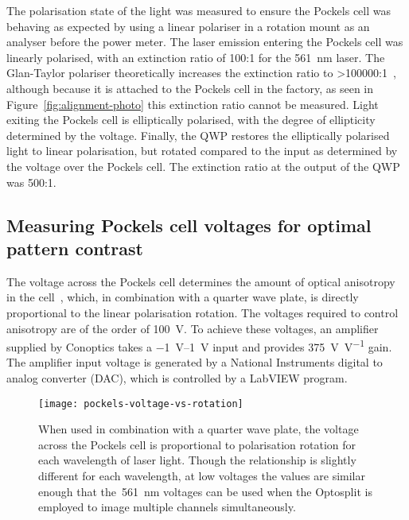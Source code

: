 The polarisation state of the light was measured to ensure the Pockels cell was behaving as expected by using a linear polariser in a rotation mount as an analyser before the power meter. 
The laser emission entering the Pockels cell was linearly polarised, with an extinction ratio of 100:1 for the \SI{561}{\nano\metre} laser. 
The Glan-Taylor polariser theoretically increases the extinction ratio to >\num{100000}:1~\cite{bennett1995handbook}, although because it is attached to the Pockels cell in the factory, as seen in Figure~\ref{fig:alignment-photo} this extinction ratio cannot be measured. 
Light exiting the Pockels cell is elliptically polarised, with the degree of ellipticity determined by the voltage. 
Finally, the QWP restores the elliptically polarised light to linear polarisation, but rotated compared to the input as determined by the voltage over the Pockels cell.
The extinction ratio at the output of the QWP was 500:1. 

\subsection{Measuring Pockels cell voltages for optimal pattern contrast}
The voltage across the Pockels cell determines the amount of optical anisotropy in the cell~\cite[\textit{ch. 8}]{hecht2017optics}, which, in combination with a quarter wave plate, is directly proportional to the linear polarisation rotation. 
The voltages required to control anisotropy are of the order of \SI{100}{\volt}. 
To achieve these voltages, an amplifier supplied by Conoptics takes a \SIrange{-1}{1}{\volt} input and provides \SI[per-mode=symbol]{375}{\volt\per\volt} gain. 
The amplifier input voltage is generated by a National Instruments digital to analog converter (DAC), which is controlled by a LabVIEW program. 

\begin{figure}[htbp!]
\centering
\texttt{[image: pockels-voltage-vs-rotation]}
\caption[LAG SIM: A Pockels cell is used to rotate the polarisation of laser light for maximum SIM pattern contrast]{When used in combination with a quarter wave plate, the voltage across the Pockels cell is proportional to polarisation rotation for each wavelength of laser light. Though the relationship is slightly different for each wavelength, at low voltages the values are similar enough that the~\SI{561}{\nano\metre} voltages can be used when the Optosplit is employed to image multiple channels simultaneously.}
\label{fig:pockels-voltage-rotation}
\end{figure}

